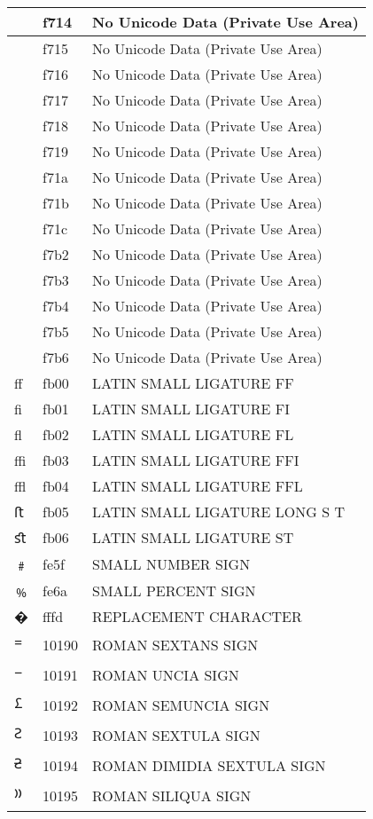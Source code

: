\documentclass[12pt,letterpaper,openany]{book}
\begin{document}
\begin{center}
\begin{supertabular}{|m{0.25in}|m{0.5in}|m{4in}|}
 & f714 & No Unicode Data (Private Use Area)\\\hline
 & f715 & No Unicode Data (Private Use Area)\\\hline
 & f716 & No Unicode Data (Private Use Area)\\\hline
 & f717 & No Unicode Data (Private Use Area)\\\hline
 & f718 & No Unicode Data (Private Use Area)\\\hline
 & f719 & No Unicode Data (Private Use Area)\\\hline
 & f71a & No Unicode Data (Private Use Area)\\\hline
 & f71b & No Unicode Data (Private Use Area)\\\hline
 & f71c & No Unicode Data (Private Use Area)\\\hline
 & f7b2 & No Unicode Data (Private Use Area)\\\hline
 & f7b3 & No Unicode Data (Private Use Area)\\\hline
 & f7b4 & No Unicode Data (Private Use Area)\\\hline
 & f7b5 & No Unicode Data (Private Use Area)\\\hline
 & f7b6 & No Unicode Data (Private Use Area)\\\hline
ﬀ & fb00 & LATIN SMALL LIGATURE FF\\\hline
ﬁ & fb01 & LATIN SMALL LIGATURE FI\\\hline
ﬂ & fb02 & LATIN SMALL LIGATURE FL\\\hline
ﬃ & fb03 & LATIN SMALL LIGATURE FFI\\\hline
ﬄ & fb04 & LATIN SMALL LIGATURE FFL\\\hline
ﬅ & fb05 & LATIN SMALL LIGATURE LONG S T\\\hline
ﬆ & fb06 & LATIN SMALL LIGATURE ST\\\hline
﹟ & fe5f & SMALL NUMBER SIGN\\\hline
﹪ & fe6a & SMALL PERCENT SIGN\\\hline
� & fffd & REPLACEMENT CHARACTER\\\hline
𐆐 & 10190 & ROMAN SEXTANS SIGN\\\hline
𐆑 & 10191 & ROMAN UNCIA SIGN\\\hline
𐆒 & 10192 & ROMAN SEMUNCIA SIGN\\\hline
𐆓 & 10193 & ROMAN SEXTULA SIGN\\\hline
𐆔 & 10194 & ROMAN DIMIDIA SEXTULA SIGN\\\hline
𐆕 & 10195 & ROMAN SILIQUA SIGN\\\hline

\end{supertabular}
\end{center}
\end{document}
